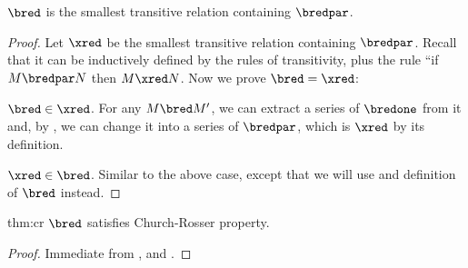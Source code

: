 \documentclass[../../../include/open-logic-section]{subfiles}
\begin{document}
\begin{lem}
  $\bred$ is the smallest transitive relation containing $\bredpar$.
\end{lem}
\begin{proof}
  Let $\xred$ be the smallest transitive relation containing $\bredpar$.
  Recall that it can be inductively defined by the rules of transitivity, plus the rule ``if
  $M \bredpar N$ then $M \xred N$. Now we prove $\bred = \xred$:
  
  $\bred \in \xred$. For any $M \bred M'$, we can extract a series of
  $\bredone$ from it and, by , we can change it
  into a series of $\bredpar$, which is $\xred$ by its definition.

  $\xred \in \bred$. Similar to the above case, except that we will
  use  and definition of $\bred$ instead.
\end{proof}

\begin{thm}{thm:cr}
  $\bred$ satisfies Church-Rosser property.
\end{thm}
\begin{proof}
  Immediate from ,  and .
\end{proof}
\end{document}
